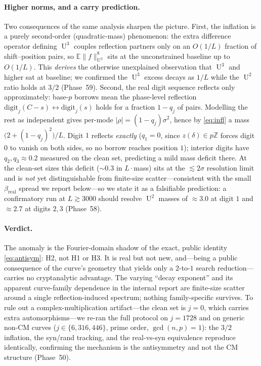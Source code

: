 \documentclass[11pt]{article}
\theoremstyle{definition}
\newcommand{\Z}{\mathbb{Z}}
\DeclareMathOperator{\Uk}{U}
\begin{document}
\paragraph{Higher norms, and a carry prediction.} Two consequences of the
same analysis sharpen the picture. First, the inflation is a purely
second-order (quadratic-mass) phenomenon: the extra difference operator
defining $\Uk^3$ couples reflection partners only on an $O(1/L)$ fraction
of shift--position pairs, so $\mathbb E\|f\|_{\Uk^3}^8$ sits at the
unconstrained baseline up to $O(1/L)$. This \emph{derives} the otherwise
unexplained observation that $\Uk^3$ and higher sat at baseline; we
confirmed the $\Uk^3$ excess decays as $1/L$ while the $\Uk^2$ ratio holds
at $3/2$ (Phase~59). Second, the real digit sequence reflects only
approximately: base-$p$ borrows mean the phase-level reflection
$\mathrm{digit}_j(C-s)\leftrightarrow\mathrm{digit}_j(s)$ holds for a
fraction $1-q_j$ of pairs. Modelling the rest as independent gives
per-mode $|\rho|=(1-q_j)\sigma^2$, hence by \eqref{eq:infl} a mass
$\big(2+(1-q_j)^2\big)/L$. Digit $1$ reflects \emph{exactly} ($q_1=0$,
since $z(\delta)\in p\Z$ forces digit $0$ to vanish on both sides, so no
borrow reaches position $1$); interior digits have $q_2,q_3\approx0.2$
measured on the clean set, predicting a mild mass deficit there. At the
clean-set sizes this deficit ($\sim0.3$ in $L\cdot$mass) sits at the
$\lesssim2\sigma$ resolution limit and is \emph{not} yet distinguishable
from finite-size scatter---consistent with the small
$\beta_{\mathrm{real}}$ spread we report below---so we state it as a
falsifiable prediction: a confirmatory run at $L\gtrsim3000$ should resolve
$\Uk^2$ masses of $\approx3.0$ at digit $1$ and $\approx2.7$ at digits
$2,3$ (Phase~58).

\paragraph{Verdict.} The anomaly is the Fourier-domain shadow of the
exact, public identity \eqref{eq:antisym}: H2, not H1 or H3. It is real
but not new, and---being a public consequence of the curve's geometry
that yields only a $2$-to-$1$ search reduction---carries no cryptanalytic
advantage. The varying ``decay exponent'' and its apparent curve-family
dependence in the internal report are finite-size scatter around a single
reflection-induced spectrum; nothing family-specific survives. To rule out
a complex-multiplication artifact---the clean set is $j{=}0$, which carries
extra automorphisms---we re-ran the full protocol on $j{=}1728$ and on
generic non-CM curves ($j\in\{6,316,446\}$, prime order, $\gcd(n,p)=1$):
the $3/2$ inflation, the syn/rand tracking, and the real-vs-syn
equivalence reproduce identically, confirming the mechanism is the
antisymmetry and not the CM structure (Phase~50).
\end{document}
